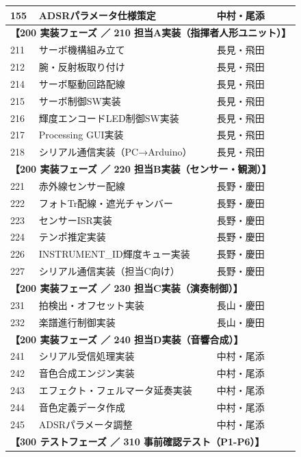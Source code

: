 \begin{longtable}{p{0.9cm}p{7cm}p{2.5cm}p{2cm}p{2cm}}
155 & ADSRパラメータ仕様策定 & 中村・尾添 &  &  \\
\midrule
\multicolumn{5}{l}{\textbf{【200 実装フェーズ ／ 210 担当A実装（指揮者人形ユニット）】}} \\
\midrule
211 & サーボ機構組み立て & 長見・飛田 &  &  \\
212 & 腕・反射板取り付け & 長見・飛田 &  &  \\
214 & サーボ駆動回路配線 & 長見・飛田 &  &  \\
215 & サーボ制御SW実装 & 長見・飛田 &  &  \\
216 & 輝度エンコードLED制御SW実装 & 長見・飛田 &  &  \\
217 & Processing GUI実装 & 長見・飛田 &  &  \\
218 & シリアル通信実装（PC→Arduino） & 長見・飛田 &  &  \\
\midrule
\multicolumn{5}{l}{\textbf{【200 実装フェーズ ／ 220 担当B実装（センサー・観測）】}} \\
\midrule
221 & 赤外線センサー配線 & 長野・慶田 &  &  \\
222 & フォトTr配線・遮光チャンバー & 長野・慶田 &  &  \\
223 & センサーISR実装 & 長野・慶田 &  &  \\
224 & テンポ推定実装 & 長野・慶田 &  &  \\
226 & INSTRUMENT\_ID輝度キュー実装 & 長野・慶田 &  &  \\
227 & シリアル通信実装（担当C向け） & 長野・慶田 &  &  \\
\midrule
\multicolumn{5}{l}{\textbf{【200 実装フェーズ ／ 230 担当C実装（演奏制御）】}} \\
\midrule
231 & 拍検出・オフセット実装 & 長山・慶田 &  &  \\
232 & 楽譜進行制御実装 & 長山・慶田 &  &  \\
\midrule
\multicolumn{5}{l}{\textbf{【200 実装フェーズ ／ 240 担当D実装（音響合成）】}} \\
\midrule
241 & シリアル受信処理実装 & 中村・尾添 &  &  \\
242 & 音色合成エンジン実装 & 中村・尾添 &  &  \\
243 & エフェクト・フェルマータ延奏実装 & 中村・尾添 &  &  \\
244 & 音色定義データ作成 & 中村・尾添 &  &  \\
245 & ADSRパラメータ調整 & 中村・尾添 &  &  \\
\midrule
\multicolumn{5}{l}{\textbf{【300 テストフェーズ ／ 310 事前確認テスト（P1-P6）】}} \\

\end{longtable}
